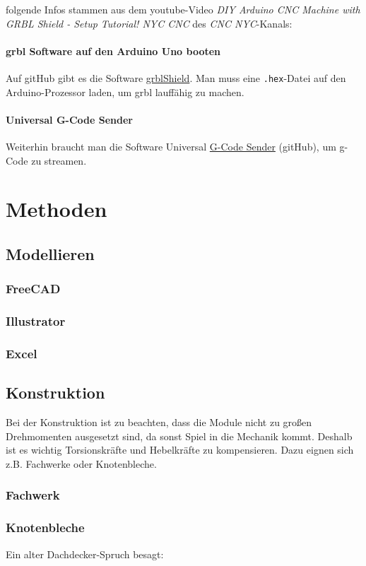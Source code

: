 \documentclass[
	a4paper,
	smallheadings,
	german,
	]
	{scrreprt}
\begin{document}
folgende Infos stammen aus dem youtube-Video \textit{DIY Arduino CNC Machine with GRBL Shield - Setup Tutorial!
NYC CNC} des \textit{CNC NYC}-Kanals\autocite{:NYC_CNC_01}:
\subsubsection{grbl Software auf den Arduino Uno booten}
Auf gitHub gibt es die Software \href{https://github.com/synthetos/grblShield}{grblShield}.
Man muss eine \texttt{.hex}-Datei auf den Arduino-Prozessor laden, um grbl lauffähig zu machen.

\subsubsection{Universal G-Code Sender}
Weiterhin braucht man die Software Universal \href{https://github.com/winder/Universal-G-Code-Sender}{G-Code Sender} (gitHub), um g-Code zu streamen.

\chapter{Methoden}

\section{Modellieren}
	\subsection{FreeCAD}
	\subsection{Illustrator}
	\subsection{Excel}
\section{Konstruktion}
Bei der Konstruktion ist zu beachten, dass die Module nicht zu großen Drehmomenten ausgesetzt sind, da sonst Spiel in die Mechanik kommt.
Deshalb ist es wichtig Torsionskräfte und Hebelkräfte zu kompensieren.
Dazu eignen sich z.B. Fachwerke oder Knotenbleche.
	\subsection{Fachwerk}
	\subsection{Knotenbleche}
Ein alter Dachdecker-Spruch besagt: 
\end{document}
